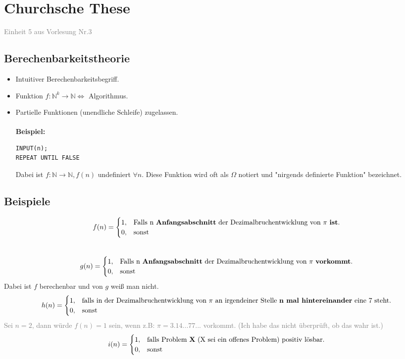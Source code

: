 \documentclass{article}
\begin{document}
	\section{Churchsche These}
	\textcolor{gray}{Einheit 5 aus Vorlesung Nr.3} \\
	\subsection{Berechenbarkeitstheorie}
	\begin{itemize}
		\item Intuitiver Berechenbarkeitsbegriff.
		\item Funktion $f: \mathbb{N}^k \rightarrow \mathbb{N} \Leftrightarrow$ Algorithmus.
		\item Partielle Funktionen (unendliche Schleife) zugelassen. \\
		\\
		\textbf{Beispiel:} 
		\begin{lstlisting}
INPUT(n);
REPEAT UNTIL FALSE
		\end{lstlisting}
		Dabei ist $f: \mathbb{N} \rightarrow \mathbb{N}, f(n)$ undefiniert $\forall n$. Diese Funktion wird oft als $\Omega$ notiert und "nirgends definierte Funktion" bezeichnet.
	\end{itemize}
	\subsection{Beispiele}
\[f(n) = \begin{cases}
			1, & \text{Falls n \textbf{Anfangsabschnitt} der Dezimalbruchentwicklung von $\pi$ \textbf{ist}.}\\
			0, & \text{sonst}
		\end{cases}\]
		\\
 \[g(n) = \begin{cases}
			1, & \text{Falls n \textbf{Anfangsabschnitt} der Dezimalbruchentwicklung von $\pi$ \textbf{vorkommt}.}\\
			0, & \text{sonst}
		\end{cases}\]
		Dabei ist $f$ berechenbar und von $g$ weiß man nicht.
\[h(n) = \begin{cases}
			1, & \text{falls in der Dezimalbruchentwicklung von $\pi$ an irgendeiner Stelle \textbf{n mal hintereinander} eine 7 steht.}\\
			0, & \text{sonst}
		\end{cases}\]
		\textcolor{gray}{Sei $n = 2$, dann würde $f(n) = 1$ sein, wenn z.B: $\pi = 3.14...77...$ vorkommt. (Ich habe das nicht überprüft, ob das wahr ist.)}
\[i(n) = \begin{cases}
			1, & \text{falls Problem \textbf{X} (X sei ein offenes Problem) positiv lösbar.}\\
			0, & \text{sonst}
		\end{cases}\]
\end{document}
